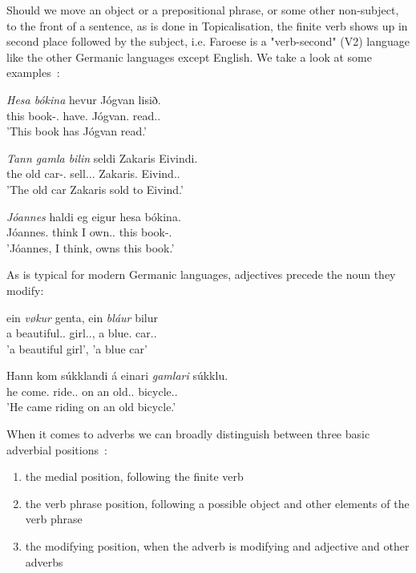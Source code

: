 \documentclass[12pt,%
    times,
]{lin-v2/lin}
\begin{document}
Should we move an object or a prepositional phrase, or some other non-subject, to the front of a sentence, as is done
in Topicalisation, the
finite verb shows up in second place followed by the subject, i.e. Faroese is a "verb-second" (V2) language like the
other Germanic languages except English. We take a look at some examples~\citep[238-239]{faroese}:
\begin{exe}
    \ex
    \begin{xlist}
        \item \gll \emph{Hesa bókina} hevur Jógvan lisið.\\
        {this book}-\Det.\Acc{} have.\Pst{} Jógvan.\Nom{} read.\Pst.\Ptcp{}\\
        \trans 'This book has Jógvan read.'
        \item \gll \emph{Tann gamla bilin} seldi Zakaris Eivindi.\\
        {the old car}-\Det.\Acc{} sell.\Third.\Sg.\Pst{} Zakaris.\Nom{} Eivind.\Dat.\\
        \trans 'The old car Zakaris sold to Eivind.'
        \item \gll \emph{Jóannes} haldi eg eigur hesa bókina.\\
        Jóannes.\Nom{} think I own.\Third\Sg.\Prs{} this book-\Det.\Acc\\
        \trans 'Jóannes, I think, owns this book.'
    \end{xlist}
\end{exe}

As is typical for modern Germanic languages, adjectives precede the noun they modify:
\begin{exe}
    \ex
    \begin{xlist}
        \item \gll ein \emph{vøkur} genta, ein \emph{bláur} bilur\\
        a beautiful.\Nom.\F{} girl.\Nom.\F{}, a blue\Nom.\M{} car.\Nom.\M{}\\
        \trans 'a beautiful girl', 'a blue car'
        \item \gll Hann kom súkklandi á einari \emph{gamlari} súkklu.\\
        he come.\Pst{} ride.\Prs.\Ptcp{} on an old.\Dat.\F{} bicycle.\Dat.\F{}\\
        \trans 'He came riding on an old bicycle.'
    \end{xlist}
\end{exe}

When it comes to adverbs we can broadly distinguish between three basic adverbial positions~\citep[241]{faroese}:
\begin{enumerate}
    \item the medial position, following the finite verb
    \item the verb phrase position, following a possible object and other elements of the verb phrase
    \item the modifying position, when the adverb is modifying and adjective and other adverbs
\end{enumerate}
\end{document}
